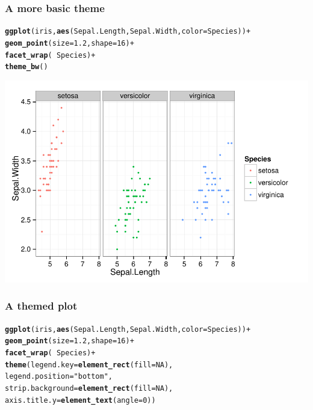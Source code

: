 \documentclass{beamer}\usepackage[]{graphicx}\usepackage[]{color}
\makeatletter
\newcommand{\hlnum}[1]{\textcolor[rgb]{0.686,0.059,0.569}{#1}}%
\newcommand{\hlstr}[1]{\textcolor[rgb]{0.192,0.494,0.8}{#1}}%
\newcommand{\hlopt}[1]{\textcolor[rgb]{0,0,0}{#1}}%
\newcommand{\hlstd}[1]{\textcolor[rgb]{0.345,0.345,0.345}{#1}}%
\newcommand{\hlkwc}[1]{\textcolor[rgb]{0.333,0.667,0.333}{#1}}%
\newcommand{\hlkwd}[1]{\textcolor[rgb]{0.737,0.353,0.396}{\textbf{#1}}}%
\newenvironment{kframe}{%
 \def\at@end@of@kframe{}%
 \ifinner\ifhmode%
  \def\at@end@of@kframe{\end{minipage}}%
  \begin{minipage}{\columnwidth}%
 \fi\fi%
 \def\FrameCommand##1{\hskip\@totalleftmargin \hskip-\fboxsep
 \colorbox{shadecolor}{##1}\hskip-\fboxsep
     \hskip-\linewidth \hskip-\@totalleftmargin \hskip\columnwidth}%
 \MakeFramed {\advance\hsize-\width
   \@totalleftmargin\z@ \linewidth\hsize
   \@setminipage}}%
 {\par\unskip\endMakeFramed%
 \at@end@of@kframe}
\newenvironment{knitrout}{}{} %
\makeatother
\begin{document}

\begin{frame}[fragile]
\frametitle{A more basic theme}
\begin{knitrout}\footnotesize
{}\color{fgcolor}\begin{kframe}
\begin{alltt}
\hlkwd{ggplot}\hlstd{(iris,} \hlkwd{aes}\hlstd{(Sepal.Length, Sepal.Width,} \hlkwc{color} \hlstd{= Species))} \hlopt{+}
    \hlkwd{geom_point}\hlstd{(}\hlkwc{size} \hlstd{=} \hlnum{1.2}\hlstd{,} \hlkwc{shape} \hlstd{=} \hlnum{16}\hlstd{)} \hlopt{+}
    \hlkwd{facet_wrap}\hlstd{(} \hlopt{~} \hlstd{Species)} \hlopt{+}
    \hlkwd{theme_bw}\hlstd{()}
\end{alltt}
\end{kframe}

{\centering \includegraphics[width=.75\linewidth]{figure/facet_wrapbw_theme} 

}



\end{knitrout}
\end{frame}


\begin{frame}[fragile]
\frametitle{A themed plot}
\begin{knitrout}\footnotesize
{}\color{fgcolor}\begin{kframe}
\begin{alltt}
\hlkwd{ggplot}\hlstd{(iris,} \hlkwd{aes}\hlstd{(Sepal.Length, Sepal.Width,} \hlkwc{color} \hlstd{= Species))} \hlopt{+}
    \hlkwd{geom_point}\hlstd{(}\hlkwc{size} \hlstd{=} \hlnum{1.2}\hlstd{,} \hlkwc{shape} \hlstd{=} \hlnum{16}\hlstd{)} \hlopt{+}
    \hlkwd{facet_wrap}\hlstd{(} \hlopt{~} \hlstd{Species)} \hlopt{+}
    \hlkwd{theme}\hlstd{(}\hlkwc{legend.key} \hlstd{=} \hlkwd{element_rect}\hlstd{(}\hlkwc{fill} \hlstd{=} \hlnum{NA}\hlstd{),}
        \hlkwc{legend.position} \hlstd{=} \hlstr{"bottom"}\hlstd{,}
        \hlkwc{strip.background} \hlstd{=} \hlkwd{element_rect}\hlstd{(}\hlkwc{fill} \hlstd{=} \hlnum{NA}\hlstd{),}
        \hlkwc{axis.title.y} \hlstd{=} \hlkwd{element_text}\hlstd{(}\hlkwc{angle} \hlstd{=} \hlnum{0}\hlstd{))}
\end{alltt}
\end{kframe}
\end{knitrout}
\end{frame}
\end{document}
